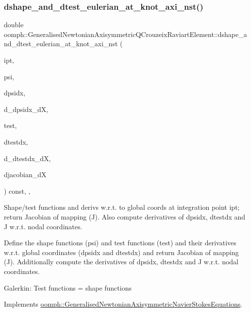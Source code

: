 \subsubsection{\texorpdfstring{dshape\+\_\+and\+\_\+dtest\+\_\+eulerian\+\_\+at\+\_\+knot\+\_\+axi\+\_\+nst()}{dshape\_and\_dtest\_eulerian\_at\_knot\_axi\_nst()}\hspace{0.1cm}{\footnotesize\ttfamily [2/2]}}
{\footnotesize\ttfamily double oomph\+::\+Generalised\+Newtonian\+Axisymmetric\+Q\+Crouzeix\+Raviart\+Element\+::dshape\+\_\+and\+\_\+dtest\+\_\+eulerian\+\_\+at\+\_\+knot\+\_\+axi\+\_\+nst (\begin{DoxyParamCaption}\item[{const unsigned \&}]{ipt,  }\item[{\hyperlink{classoomph_1_1Shape}{Shape} \&}]{psi,  }\item[{\hyperlink{classoomph_1_1DShape}{D\+Shape} \&}]{dpsidx,  }\item[{\hyperlink{classoomph_1_1RankFourTensor}{Rank\+Four\+Tensor}$<$ double $>$ \&}]{d\+\_\+dpsidx\+\_\+dX,  }\item[{\hyperlink{classoomph_1_1Shape}{Shape} \&}]{test,  }\item[{\hyperlink{classoomph_1_1DShape}{D\+Shape} \&}]{dtestdx,  }\item[{\hyperlink{classoomph_1_1RankFourTensor}{Rank\+Four\+Tensor}$<$ double $>$ \&}]{d\+\_\+dtestdx\+\_\+dX,  }\item[{\hyperlink{classoomph_1_1DenseMatrix}{Dense\+Matrix}$<$ double $>$ \&}]{djacobian\+\_\+dX }\end{DoxyParamCaption}) const\hspace{0.3cm}{\ttfamily [inline]}, {\ttfamily [protected]}, {\ttfamily [virtual]}}



Shape/test functions and derivs w.\+r.\+t. to global coords at integration point ipt; return Jacobian of mapping (J). Also compute derivatives of dpsidx, dtestdx and J w.\+r.\+t. nodal coordinates. 

Define the shape functions (psi) and test functions (test) and their derivatives w.\+r.\+t. global coordinates (dpsidx and dtestdx) and return Jacobian of mapping (J). Additionally compute the derivatives of dpsidx, dtestdx and J w.\+r.\+t. nodal coordinates.

Galerkin\+: Test functions = shape functions 

Implements \hyperlink{classoomph_1_1GeneralisedNewtonianAxisymmetricNavierStokesEquations_a768856dbac816acd9b207ed6065bcae7}{oomph\+::\+Generalised\+Newtonian\+Axisymmetric\+Navier\+Stokes\+Equations}.



